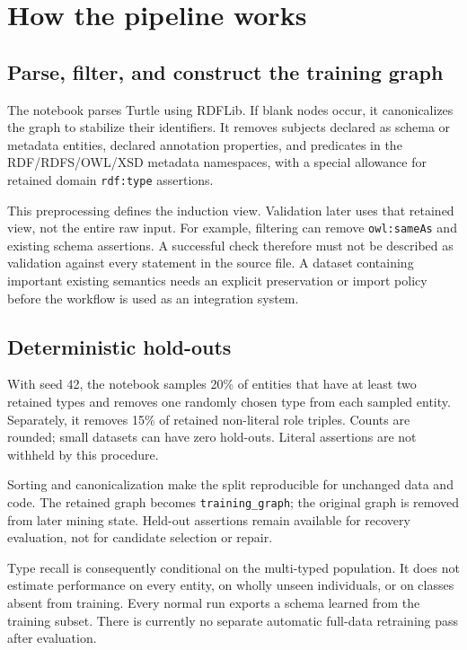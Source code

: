 \documentclass[11pt,a4paper]{article}
\newcommand{\code}[1]{\nolinkurl{#1}}
\begin{document}
\section{How the pipeline works}\label{sec:workflow}

\subsection{Parse, filter, and construct the training graph}
The notebook parses Turtle using RDFLib. If blank nodes occur, it canonicalizes
the graph to stabilize their identifiers. It removes subjects declared as schema
or metadata entities, declared annotation properties, and predicates in the
RDF/RDFS/OWL/XSD metadata namespaces, with a special allowance for retained domain
\code{rdf:type} assertions.

This preprocessing defines the induction view. Validation later uses that
retained view, not the entire raw input. For example, filtering can remove
\code{owl:sameAs} and existing schema assertions. A successful check therefore
must not be described as validation against every statement in the source file.
A dataset containing important existing semantics needs an explicit preservation
or import policy before the workflow is used as an integration system.

\subsection{Deterministic hold-outs}
With seed 42, the notebook samples 20\% of entities that have at least two
retained types and removes one randomly chosen type from each sampled entity.
Separately, it removes 15\% of retained non-literal role triples. Counts are
rounded; small datasets can have zero hold-outs. Literal assertions are not
withheld by this procedure.

Sorting and canonicalization make the split reproducible for unchanged data and
code. The retained graph becomes \code{training_graph}; the original graph is
removed from later mining state. Held-out assertions remain available for
recovery evaluation, not for candidate selection or repair.

Type recall is consequently conditional on the multi-typed population. It does
not estimate performance on every entity, on wholly unseen individuals, or on
classes absent from training. Every normal run exports a schema learned from the
training subset. There is currently no separate automatic full-data retraining
pass after evaluation.
\end{document}
